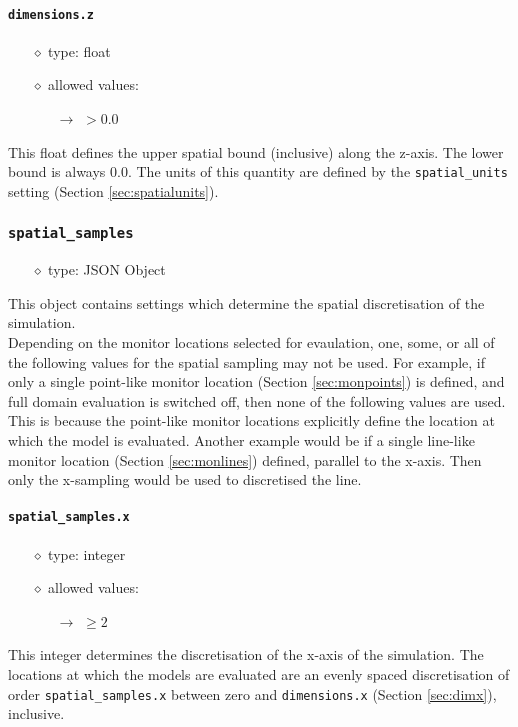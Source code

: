 \documentclass[]{article}
\def\code#1{\texttt{#1}}
\begin{document}
\paragraph{\code{dimensions.z}}\label{sec:dimz}
\begin{itemize}
    \item[$\diamond$] type: float 
    \item[$\diamond$] allowed values:
    \begin{itemize}
        \item[$\rightarrow$] $>0.0$
    \end{itemize}
\end{itemize}
This float defines the upper spatial bound (inclusive) along the z-axis. The
lower bound is always 0.0. The units of this quantity are defined by the
\code{spatial\_units} setting (Section \ref{sec:spatialunits}).

\subsubsection{\code{spatial\_samples}}
\begin{itemize}
    \item[$\diamond$] type: JSON Object 
\end{itemize}
This object contains settings which determine the spatial discretisation of the
simulation.\\

\noindent Depending on the monitor locations selected for evaulation, one, some,
or all of the following values for the spatial sampling may not be used. For
example, if only a single point-like monitor location (Section
\ref{sec:monpoints}) is defined, and full domain 
evaluation is switched off, then none of the following values are used. This is
because the point-like monitor locations explicitly define the location at which
the model is evaluated. Another example would be if a single line-like monitor
location (Section \ref{sec:monlines}) defined, parallel to the x-axis. Then only
the x-sampling would be used to discretised the line.

\paragraph{\code{spatial\_samples.x}}
\begin{itemize}
    \item[$\diamond$] type: integer 
    \item[$\diamond$] allowed values:
    \begin{itemize}
        \item[$\rightarrow$] $\geq2$
    \end{itemize}
\end{itemize}
This integer determines the discretisation of the x-axis of the simulation. The
locations at which the models are evaluated are an evenly spaced discretisation
of order \code{spatial\_samples.x} between zero and \code{dimensions.x} (Section
\ref{sec:dimx}), inclusive.
\end{document}
